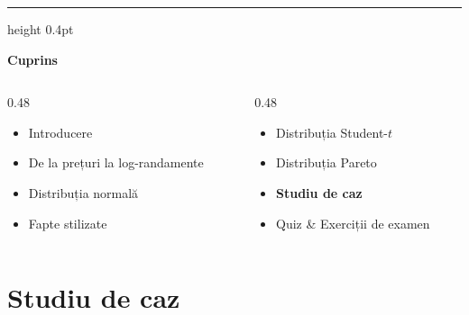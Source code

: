 \documentclass[9pt, aspectratio=169, t]{beamer}
\theoremstyle{definition}
\begin{document}
{
\begin{frame}{}
    {\color{FooterGray}\hrule height 0.4pt}
    \vspace{0.1cm}
    {\Large\textcolor{IDAred}{\textbf{Cuprins}}}
    \vspace{0.2cm}
    {\small
    \begin{columns}[T]
        \begin{column}{0.48\textwidth}
            \begin{itemize}
                \item Introducere \checkmark
                \item De la prețuri la log-randamente \checkmark
                \item Distribuția normală \checkmark
                \item Fapte stilizate \checkmark
            \end{itemize}
        \end{column}
        \begin{column}{0.48\textwidth}
            \begin{itemize}
                \item Distribuția Student-$t$ \checkmark
                \item Distribuția Pareto \checkmark
                \item \textbf{Studiu de caz}
                \item Quiz \& Exerciții de examen
            \end{itemize}
        \end{column}
    \end{columns}
    }
\end{frame}
}

\section{Studiu de caz}
\end{document}

